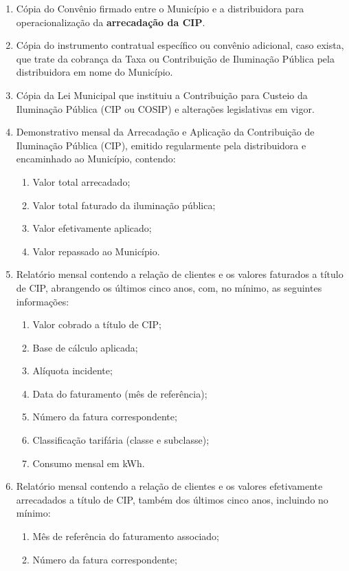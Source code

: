 \documentclass[11pt,a4paper]{article}
\begin{document}
\begin{enumerate}[resume]
\item Cópia do Convênio firmado entre o Município e a distribuidora para operacionalização da \textbf{arrecadação da CIP}.
\label{inicial}
\item Cópia do instrumento contratual específico ou convênio adicional, caso exista, que trate da cobrança da Taxa ou Contribuição de Iluminação Pública pela distribuidora em nome do Município.
\item Cópia da Lei Municipal que instituiu a Contribuição para Custeio da Iluminação Pública (CIP ou COSIP) e alterações legislativas em vigor.
\item Demonstrativo mensal da Arrecadação e Aplicação da Contribuição de Iluminação Pública (CIP), emitido regularmente pela distribuidora e encaminhado ao Município, contendo:
\begin{enumerate}
  \item Valor total arrecadado;
  \item Valor total faturado da iluminação pública;
  \item Valor efetivamente aplicado;
  \item Valor repassado ao Município.
\end{enumerate}
\item Relatório mensal contendo a relação de clientes e os valores faturados a título de CIP, abrangendo os últimos cinco anos, com, no mínimo, as seguintes informações:
\begin{enumerate}
  \item Valor cobrado a título de CIP;
  \item Base de cálculo aplicada;
  \item Alíquota incidente;
  \item Data do faturamento (mês de referência);
  \item Número da fatura correspondente;
  \item Classificação tarifária (classe e subclasse);
  \item Consumo mensal em kWh.
\end{enumerate}
\item Relatório mensal contendo a relação de clientes e os valores efetivamente arrecadados a título de CIP, também dos últimos cinco anos, incluindo no mínimo:
\begin{enumerate}
  \item Mês de referência do faturamento associado;
  \item Número da fatura correspondente;

\end{enumerate}
\end{enumerate}
\end{document}
